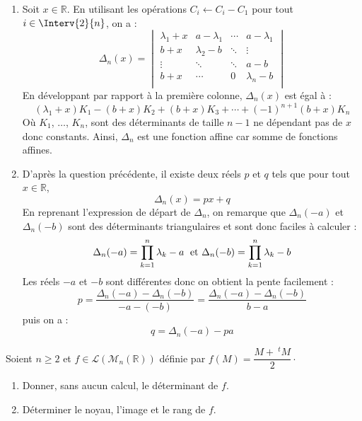 \documentclass[a4paper,10pt]{report}
\begin{document}
\begin{enumerate}
\item Soit $x \in \mathbb{R}$. En utilisant les opérations $C_i \leftarrow C_i - C_1$ pour tout $i \in \Interv{2}{n}$, on a :
    \[
    \Delta_n(x) =
    \begin{vmatrix}
        {\lambda_1 + x} & a - \lambda_1 & \cdots & a- \lambda_1 \\
        {b + x} & \lambda_2-b & \ddots & \vdots \\
        \vdots & \ddots & \ddots & a-b \\
        {b + x} & \cdots & 0 & \lambda_n-b \\
    \end{vmatrix}    
    \]
En développant par rapport à la première colonne, $\Delta_n(x)$ est égal à :
$$ (\lambda_1+x) K_1 - (b+x) K_2 + (b+x) K_3 + \cdots + (-1)^{n+1} (b+x) K_n$$
Où $K_1$, $\ldots$, $K_n$, sont des déterminants de taille $n-1$ ne dépendant pas de $x$ donc constants. Ainsi, $\Delta_n$ est une fonction affine car somme de fonctions affines.
\item D'après la question précédente, il existe deux réels $p$ et $q$ tels que pour tout $x \in \mathbb{R}$,
$$ \Delta_n(x) = px + q$$
En reprenant l'expression de départ de $\Delta_n$, on remarque que $\Delta_n(-a)$ et $\Delta_n(-b)$ sont des déterminants triangulaires et sont donc faciles à calculer :
$$ \Delta_n(-a) = \prod_{k=1}^n \lambda_k - a \; \hbox{ et } \Delta_n(-b) = \prod_{k=1}^n \lambda_k - b$$
Les réels $-a$ et $-b$ sont différentes donc on obtient la pente facilement :
$$ p = \dfrac{\Delta_n(-a) - \Delta_n(-b)}{-a-(-b)} = \dfrac{\Delta_n(-a) - \Delta_n(-b)}{b-a}$$
puis on a :
$$ q = \Delta_n(-a) -pa$$
\end{enumerate}

\begin{Exercice}{} Soient $n \geq 2$ et $f \in \mathcal{L}(\mathcal{M}_n(\mathbb{R}))$ définie par $f(M) = \dfrac{M+~^tM}{2}\cdot$

\begin{enumerate}
\item Donner, sans aucun calcul, le déterminant de $f$.
\item Déterminer le noyau, l'image et le rang de $f$. 
\end{enumerate}
\end{Exercice}

\corr
\end{document}
